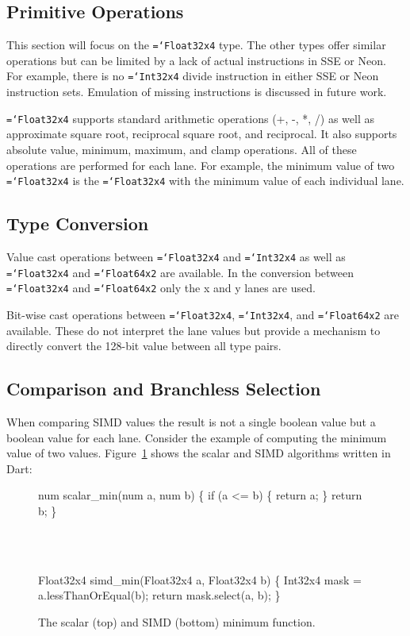 \documentclass{sigplanconf}
\newcommand{\ttt}[1]{{\texttt{\hyphenchar\font=`\-\relax #1}}}%
\begin{document}
\subsection{Primitive Operations}

This section will focus on the \ttt{Float32x4} type. The other types offer
similar operations but can be limited by a lack of actual instructions in SSE or
Neon. For example, there is no \ttt{Int32x4} divide instruction in either SSE or
Neon instruction sets. Emulation of missing instructions is discussed in future
work.

\ttt{Float32x4} supports standard arithmetic operations (+, -, *, /) as well as
approximate square root, reciprocal square root, and reciprocal. It also
supports absolute value, minimum, maximum, and clamp operations. All of these
operations are performed for each lane. For example, the minimum value of two
\ttt{Float32x4} is the \ttt{Float32x4} with the minimum value of each individual
lane.

\subsection{Type Conversion}

Value cast operations between \ttt{Float32x4} and \ttt{Int32x4} as well as
\ttt{Float32x4} and \ttt{Float64x2} are available. In the conversion between
\ttt{Float32x4} and \ttt{Float64x2} only the x and y lanes are used.

Bit-wise cast operations between \ttt{Float32x4}, \ttt{Int32x4}, and
\ttt{Float64x2} are available. These do not interpret the lane values but
provide a mechanism to directly convert the 128-bit value between all type
pairs.

\subsection{Comparison and Branchless Selection}

When comparing SIMD values the result is not a single boolean value but a
boolean value for each lane. Consider the example of computing the minimum value
of two values. Figure~\ref{fig:min} shows the scalar and SIMD algorithms written
in Dart:

\begin{figure}
\begin{small}
\begin{program}[style=tt, number=true]
nu\tab{}m scalar\_min(num a, num b) \{
  if\tab{} (a <= b) \{
    return a;\untab{}
  \}
  return b;\untab{}
\}
\end{program}
\end{small}
\ \ \\ \ \ \\
\begin{small}
\begin{program}[style=tt, number=true]
Fl\tab{}oat32x4 simd\_min(Float32x4 a, Float32x4 b) \{
  Int32x4 mask = a.lessThanOrEqual(b);
  return mask.select(a, b);\untab{}
\}
\end{program}
\end{small}
\caption{The scalar (top) and SIMD (bottom) minimum function.}
\label{fig:min}
\end{figure}
\end{document}
